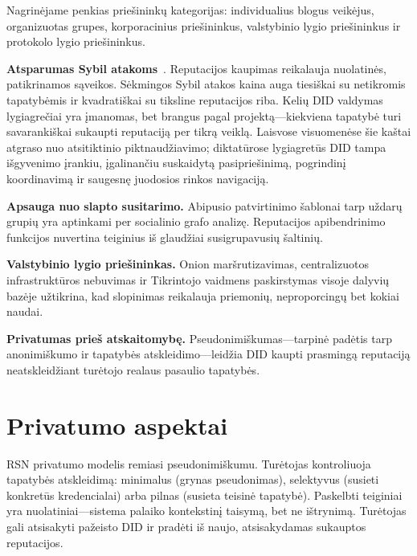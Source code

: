 \documentclass[11pt,a4paper,twocolumn]{article}
\begin{document}
Nagrinėjame penkias priešininkų kategorijas: individualius blogus veikėjus, organizuotas grupes, korporacinius priešininkus, valstybinio lygio priešininkus ir protokolo lygio priešininkus.

\textbf{Atsparumas Sybil atakoms}~\cite{douceur2002}. Reputacijos kaupimas reikalauja nuolatinės, patikrinamos sąveikos. Sėkmingos Sybil atakos kaina auga tiesiškai su netikromis tapatybėmis ir kvadratiškai su tiksline reputacijos riba. Kelių DID valdymas lygiagrečiai yra įmanomas, bet brangus pagal projektą---kiekviena tapatybė turi savarankiškai sukaupti reputaciją per tikrą veiklą. Laisvose visuomenėse šie kaštai atgraso nuo atsitiktinio piktnaudžiavimo; diktatūrose lygiagretūs DID tampa išgyvenimo įrankiu, įgalinančiu suskaidytą pasipriešinimą, pogrindinį koordinavimą ir saugesnę juodosios rinkos navigaciją.

\textbf{Apsauga nuo slapto susitarimo.} Abipusio patvirtinimo šablonai tarp uždarų grupių yra aptinkami per socialinio grafo analizę. Reputacijos apibendrinimo funkcijos nuvertina teiginius iš glaudžiai susigrupavusių šaltinių.

\textbf{Valstybinio lygio priešininkas.} Onion maršrutizavimas, centralizuotos infrastruktūros nebuvimas ir Tikrintojo vaidmens paskirstymas visoje dalyvių bazėje užtikrina, kad slopinimas reikalauja priemonių, neproporcingų bet kokiai naudai.

\textbf{Privatumas prieš atskaitomybę.} Pseudonimiškumas---tarpinė padėtis tarp anonimiškumo ir tapatybės atskleidimo---leidžia DID kaupti prasmingą reputaciją neatskleidžiant turėtojo realaus pasaulio tapatybės.

\section{Privatumo aspektai}

RSN privatumo modelis remiasi pseudonimiškumu. Turėtojas kontroliuoja tapatybės atskleidimą: minimalus (grynas pseudonimas), selektyvus (susieti konkretūs kredencialai) arba pilnas (susieta teisinė tapatybė). Paskelbti teiginiai yra nuolatiniai---sistema palaiko kontekstinį taisymą, bet ne ištrynimą. Turėtojas gali atsisakyti pažeisto DID ir pradėti iš naujo, atsisakydamas sukauptos reputacijos.

\end{document}
